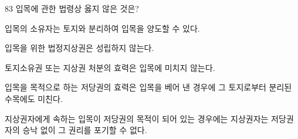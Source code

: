 \begin{question}{83}
입목에 관한 법령상 옳지 않은 것은?
\begin{choices}
  \item 입목의 소유자는 토지와 분리하여 입목을 양도할 수 있다.
  \item 입목을 위한 법정지상권은 성립하지 않는다.
  \item 토지소유권 또는 지상권 처분의 효력은 입목에 미치지 않는다.
  \item 입목을 목적으로 하는 저당권의 효력은 입목을 베어 낸 경우에 그 토지로부터 분리된 수목에도 미친다.
  \item 지상권자에게 속하는 입목이 저당권의 목적이 되어 있는 경우에는 지상권자는 저당권자의 승낙 없이 그 권리를 포기할 수 없다.
\end{choices}
\end{question}
